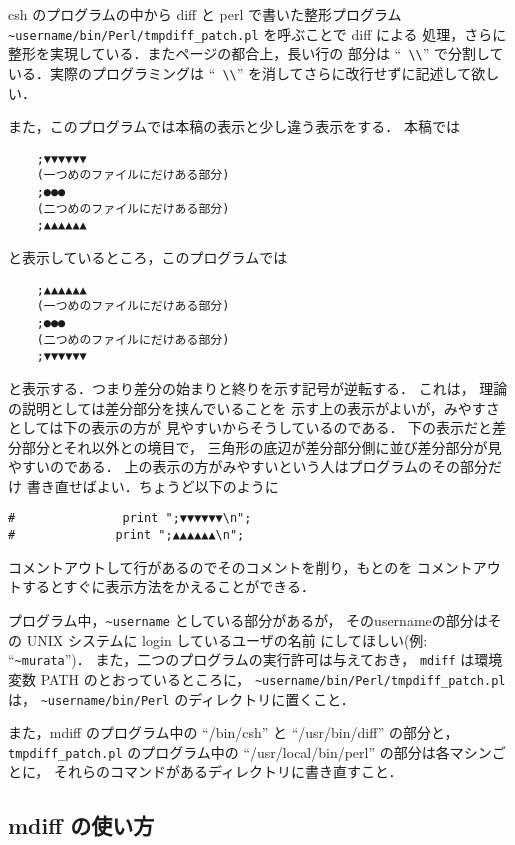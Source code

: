 csh のプログラムの中から diff と perl で書いた整形プログラム\\
\verb+~username/bin/Perl/tmpdiff_patch.pl+ を呼ぶことで diff による
処理，さらに整形を実現している．またページの都合上，長い行の
部分は ``\verb+ \\+'' で分割している．実際のプログラミングは
``\verb+ \\+'' を消してさらに改行せずに記述して欲しい．

また，このプログラムでは本稿の表示と少し違う表示をする．
本稿では
\begin{verbatim}
    ;▼▼▼▼▼▼
    (一つめのファイルにだけある部分)
    ;●●●
    (二つめのファイルにだけある部分)
    ;▲▲▲▲▲▲
\end{verbatim}
と表示しているところ，このプログラムでは
\begin{verbatim}
    ;▲▲▲▲▲▲
    (一つめのファイルにだけある部分)
    ;●●●
    (二つめのファイルにだけある部分)
    ;▼▼▼▼▼▼
\end{verbatim}
と表示する．つまり差分の始まりと終りを示す記号が逆転する．
これは， 理論の説明としては差分部分を挟んでいることを
示す上の表示がよいが，みやすさとしては下の表示の方が
見やすいからそうしているのである．
下の表示だと差分部分とそれ以外との境目で，
三角形の底辺が差分部分側に並び差分部分が見やすいのである．
上の表示の方がみやすいという人はプログラムのその部分だけ
書き直せばよい．ちょうど以下のように
\begin{verbatim}
#               print ";▼▼▼▼▼▼\n";
#              print ";▲▲▲▲▲▲\n";
\end{verbatim}
コメントアウトして行があるのでそのコメントを削り，もとのを
コメントアウトするとすぐに表示方法をかえることができる．

プログラム中，\verb+~username+ としている部分があるが，
そのusernameの部分はその UNIX システムに login しているユーザの名前
にしてほしい(例: ``\verb+~murata+'')．
また，二つのプログラムの実行許可は与えておき，
\verb+mdiff+ は環境変数 PATH のとおっているところに，
\verb+~username/bin/Perl/tmpdiff_patch.pl+ は，
\verb+~username/bin/Perl+ のディレクトリに置くこと．

また，mdiff のプログラム中の ``/bin/csh'' と ``/usr/bin/diff'' 
の部分と， \verb+tmpdiff_patch.pl+ のプログラム中の
``/usr/local/bin/perl'' の部分は各マシンごとに，
それらのコマンドがあるディレクトリに書き直すこと．

\subsection{mdiff の使い方}\label{sec:use_mdiff}

